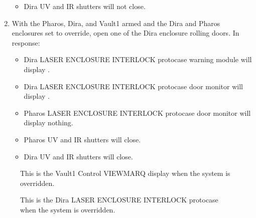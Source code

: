 \documentclass[letterpaper,10pt,english]{sphinxmanual}
\begin{document}
\begin{enumerate}
\begin{itemize}
\item {} 
\sphinxAtStartPar
Dira UV and IR shutters will not close.

\end{itemize}

\item {} 
\sphinxAtStartPar
With the Pharos, Dira, and Vault\sphinxhyphen{}1 armed and the Dira and Pharos enclosures set to override, open one of the Dira enclosure rolling doors.
In response:
\begin{itemize}
\item {} 
\sphinxAtStartPar
Dira LASER ENCLOSURE INTERLOCK protocase warning module will display .

\item {} 
\sphinxAtStartPar
Dira LASER ENCLOSURE INTERLOCK protocase door monitor will display .

\item {} 
\sphinxAtStartPar
Pharos LASER ENCLOSURE INTERLOCK protocase door monitor will display nothing.

\item {} 
\sphinxAtStartPar
Pharos UV and IR shutters will close.

\item {} 
\sphinxAtStartPar
Dira UV and IR shutters will close.

\end{itemize}

\end{enumerate}

\begin{figure}[htbp]
\centering
\capstart

\noindent{}
\caption{ This is the Vault\sphinxhyphen{}1 Control VIEWMARQ display when the system is overridden.}\label{\detokenize{testing_documentation/Vault-1_laser:id14}}\end{figure}

\begin{figure}[htbp]
\centering
\capstart

\noindent{}
\caption{ This is the Dira LASER ENCLOSURE INTERLOCK protocase when the system is overridden.}\label{\detokenize{testing_documentation/Vault-1_laser:id15}}\end{figure}
\end{document}
